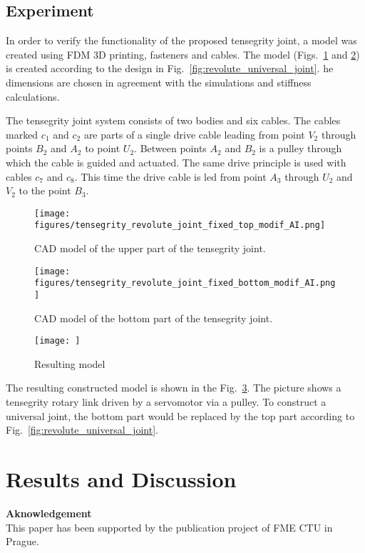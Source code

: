 \documentclass{article}
\begin{document}
\subsection{Experiment}

In order to verify the functionality of the proposed tensegrity joint, a model was created using FDM 3D printing, fasteners and cables. The model (Figs.~\ref{fig:CAD_model_upper_part} and \ref{fig:CAD_model_bottom_part}) is created according to the design in Fig.~\ref{fig:revolute_universal_joint}. he dimensions are chosen in agreement with the simulations and stiffness calculations.

The tensegrity joint system consists of two bodies and six cables. The cables marked $c_1$ and $c_2$ are parts of a single drive cable leading from point $V_2$ through points $B_2$ and $A_2$ to point $U_2$. Between points $A_2$ and $B_2$ is a pulley through which the cable is guided and actuated. The same drive principle is used with cables $c_7$ and $c_8$. This time the drive cable is led from point $A_3$ through $U_2$ and $V_2$ to the point $B_3$. 

\begin{figure}
    \centering
    \texttt{[image: figures/tensegrity\_revolute\_joint\_fixed\_top\_modif\_AI.png]}
    \caption{CAD model of the upper part of the tensegrity joint.}
    \label{fig:CAD_model_upper_part}
\end{figure}

\begin{figure}
    \centering
    \texttt{[image: figures/tensegrity\_revolute\_joint\_fixed\_bottom\_modif\_AI.png]}
    \caption{CAD model of the bottom part of the tensegrity joint.}
    \label{fig:CAD_model_bottom_part}
\end{figure}

\begin{figure}
    \centering
    \texttt{[image: ]}
    \caption{Resulting model}
    \label{fig:resulting_model}
\end{figure}


The resulting constructed model is shown in the Fig.~\ref{fig:resulting_model}. The picture shows a tensegrity rotary link driven by a servomotor via a pulley. To construct a universal joint, the bottom part would be replaced by the top part according to Fig.~\ref{fig:revolute_universal_joint}. 


\section{Results and Discussion}





\medskip

{\bf Aknowledgement}\\
This paper has been supported by the publication project of FME CTU in Prague.

\end{document}

